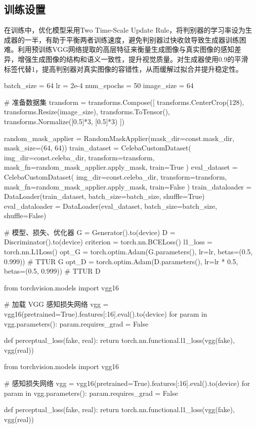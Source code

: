 \documentclass[12pt, a4paper, oneside]{ctexart}
\numberwithin{equation}{section}  %
\begin{document}
\subsection{训练设置}
在训练中，优化模型采用Two Time-Scale Update Rule，将判别器的学习率设为生成器的一半，有助于平衡两者训练速度，避免判别器过快收敛导致生成器训练困难。利用预训练VGG网络提取的高层特征来衡量生成图像与真实图像的感知差异，增强生成图像的结构和语义一致性，提升视觉质量。对生成器使用0.9的平滑标签代替1，提高判别器对真实图像的容错性，从而缓解过拟合并提升稳定性。
\begin{pythoncode}
batch_size = 64
lr = 2e-4
num_epochs = 50
image_size = 64

# 准备数据集
transform = transforms.Compose([
    transforms.CenterCrop(128),
    transforms.Resize(image_size),
    transforms.ToTensor(),
    transforms.Normalize([0.5]*3, [0.5]*3)
])

random_mask_applier = RandomMaskApplier(mask_dir=const.mask_dir, mask_size=(64, 64))
train_dataset = CelebaCustomDataset(
    img_dir=const.celeba_dir,
    transform=transform,
    mask_fn=random_mask_applier.apply_mask,
    train=True
)
eval_dataset = CelebaCustomDataset(
    img_dir=const.celeba_dir,
    transform=transform,
    mask_fn=random_mask_applier.apply_mask,
    train=False
)
train_dataloader = DataLoader(train_dataset, batch_size=batch_size, shuffle=True)
eval_dataloader = DataLoader(eval_dataset, batch_size=batch_size, shuffle=False)

# 模型、损失、优化器
G = Generator().to(device)
D = Discriminator().to(device)
criterion = torch.nn.BCELoss()
l1_loss = torch.nn.L1Loss()
opt_G = torch.optim.Adam(G.parameters(), lr=lr, betas=(0.5, 0.999))  # TTUR G
opt_D = torch.optim.Adam(D.parameters(), lr=lr * 0.5, betas=(0.5, 0.999))  # TTUR D



from torchvision.models import vgg16

# 加载 VGG 感知损失网络
vgg = vgg16(pretrained=True).features[:16].eval().to(device)
for param in vgg.parameters():
    param.requires_grad = False

def perceptual_loss(fake, real):
    return torch.nn.functional.l1_loss(vgg(fake), vgg(real))

from torchvision.models import vgg16

# 感知损失网络
vgg = vgg16(pretrained=True).features[:16].eval().to(device)
for param in vgg.parameters():
    param.requires_grad = False

def perceptual_loss(fake, real):
    return torch.nn.functional.l1_loss(vgg(fake), vgg(real))
\end{pythoncode}
\end{document}
